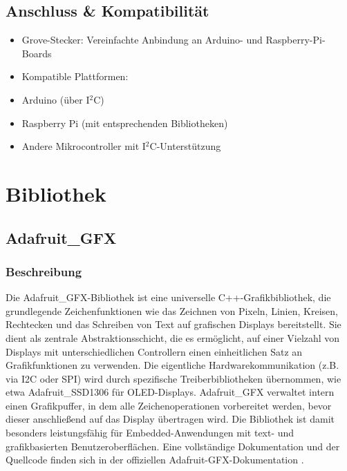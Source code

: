 \subsection{Anschluss \& Kompatibilität}

\begin{itemize}
	\item Grove-Stecker: Vereinfachte Anbindung an Arduino- und Raspberry-Pi-Boards
	
	\item Kompatible Plattformen:
	
	\item Arduino (über I$^2$C)
	
	\item Raspberry Pi (mit entsprechenden Bibliotheken)
	
	\item Andere Mikrocontroller mit I$^2$C-Unterstützung
\end{itemize}
\cite{Seeedstudio:2025b}

\section{Bibliothek}

\subsection{Adafruit\_GFX} \label{sec:Adafruit_GFX.h}

\subsubsection{Beschreibung}

Die Adafruit\_GFX-Bibliothek ist eine universelle C++-Grafikbibliothek, die grundlegende Zeichenfunktionen wie das Zeichnen von Pixeln, Linien, Kreisen, Rechtecken und das Schreiben von Text auf grafischen Displays bereitstellt. Sie dient als zentrale Abstraktionsschicht, die es ermöglicht, auf einer Vielzahl von Displays mit unterschiedlichen Controllern einen einheitlichen Satz an Grafikfunktionen zu verwenden. Die eigentliche Hardwarekommunikation (z.B. via I2C oder SPI) wird durch spezifische Treiberbibliotheken übernommen, wie etwa Adafruit\_SSD1306 für OLED-Displays. Adafruit\_GFX verwaltet intern einen Grafikpuffer, in dem alle Zeichenoperationen vorbereitet werden, bevor dieser anschließend auf das Display übertragen wird. Die Bibliothek ist damit besonders leistungsfähig für Embedded-Anwendungen mit text- und grafikbasierten Benutzeroberflächen. Eine vollständige Dokumentation und der Quellcode finden sich in der offiziellen Adafruit-GFX-Dokumentation \cite{Adafruit:2024GFX}\cite{Adafruit:2024GFXLibrary}.

